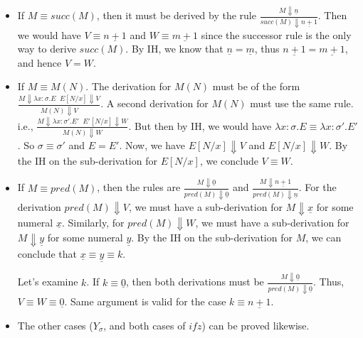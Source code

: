     \begin{itemize}
        \item If $M \equiv succ(M)$, then it must be derived by the rule $\frac{M \Downarrow \underline{n}}{succ(M) \Downarrow \underline{n+1}}$.
              Then we would have $V \equiv \underline{n+1}$ and $W \equiv \underline{m+1}$ since the successor rule is the only way to derive $succ(M)$.
              By IH, we know that $\underline{n} = \underline{m}$, thus $\underline{n+1} = \underline{m+1}$, and hence $V = W$.
        
        \item If $M \equiv M(N)$. The derivation for $M(N)$ must be of the form $\frac{M \Downarrow \lambda x:\sigma.E \;\; E[N/x] \Downarrow V}{M(N) \Downarrow V}$.
              A second derivation for $M(N)$ must use the same rule. i.e., $\frac{M \Downarrow \lambda x:\sigma'.E' \;\; E'[N/x] \Downarrow W}{M(N) \Downarrow W}$.
              But then by IH, we would have $\lambda x:\sigma.E \equiv \lambda x:\sigma'.E'$. So $\sigma \equiv \sigma'$ and $E = E'$. Now, we have $E[N/x] \Downarrow V$ and $E[N/x] \Downarrow W$.
              By the IH on the sub-derivation for $E[N/x]$, we conclude $V \equiv W$.
        \item If $M \equiv pred(M)$, then the rules are $\frac{M \Downarrow \underline{0}}{pred(M) \Downarrow \underline{0}}$ and $\frac{M \Downarrow \underline{n+1}}{pred(M) \Downarrow \underline{n}}$.
              For the derivation $pred(M) \Downarrow V$, we must have a sub-derivation for $M \Downarrow \underline{x}$ for some numeral $\underline{x}$.
              Similarly, for $pred(M) \Downarrow W$, we must have a sub-derivation for $M \Downarrow \underline{y}$ for some numeral $\underline{y}$. 
              By the IH on the sub-derivation for $M$, we can conclude that $\underline{x} \equiv \underline{y} \equiv k$.
              
              Let's examine $k$.
              If $k \equiv \underline{0}$, then both derivations must be $\frac{M \Downarrow \underline{0}}{pred(M) \Downarrow \underline{0}}$. Thus, $V \equiv W \equiv \underline{0}$.
              Same argument is valid for the case $k \equiv \underline{n+1}$.

        \item The other cases ($Y_\sigma$, and both cases of $ifz$) can be proved likewise.
    \end{itemize}
